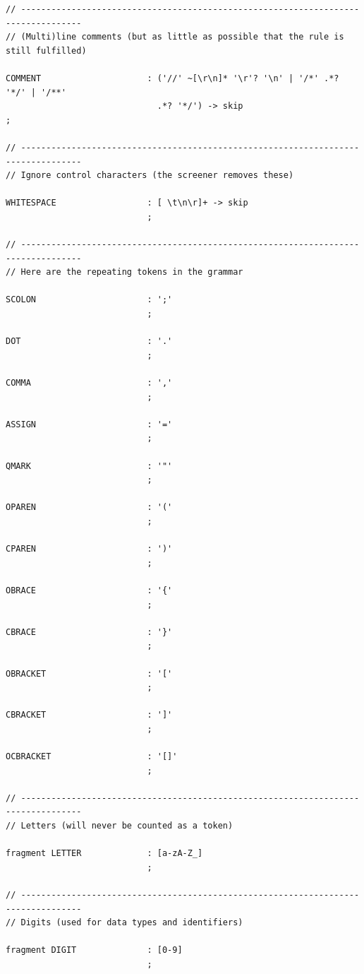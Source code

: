 \begin{lstlisting}[frame=htrbl, caption={Lexer rules of grammar {\ttfamily E}}, label={lst:le}, basicstyle=\scriptsize]
// ----------------------------------------------------------------------------------
// (Multi)line comments (but as little as possible that the rule is still fulfilled)

COMMENT                     : ('//' ~[\r\n]* '\r'? '\n' | '/*' .*? '*/' | '/**' 
                              .*? '*/') -> skip
;

// ----------------------------------------------------------------------------------
// Ignore control characters (the screener removes these)

WHITESPACE                  : [ \t\n\r]+ -> skip
                            ;

// ----------------------------------------------------------------------------------
// Here are the repeating tokens in the grammar

SCOLON                      : ';'
                            ;

DOT                         : '.'
                            ;

COMMA                       : ','
                            ;

ASSIGN                      : '='
                            ;

QMARK                       : '"'
                            ;

OPAREN                      : '('
                            ;

CPAREN                      : ')'
                            ;

OBRACE                      : '{'
                            ;

CBRACE                      : '}'
                            ;

OBRACKET                    : '['
                            ;

CBRACKET                    : ']'
                            ;

OCBRACKET                   : '[]'
                            ;

// ----------------------------------------------------------------------------------
// Letters (will never be counted as a token)

fragment LETTER             : [a-zA-Z_]
                            ;

// ----------------------------------------------------------------------------------
// Digits (used for data types and identifiers)

fragment DIGIT              : [0-9]
                            ;
\end{lstlisting}

